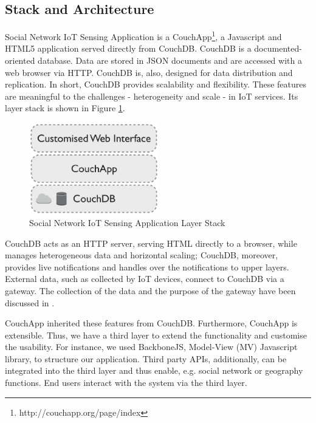 \subsection{Stack and Architecture}
Social Network IoT Sensing Application is a CouchApp\footnote{http://couchapp.org/page/index}, a Javascript and HTML5 application served directly from CouchDB. CouchDB is a documented-oriented database. Data are stored in JSON documents and are accessed with a web browser via HTTP. CouchDB is, also, designed for data distribution and replication. In short, CouchDB provides scalability and flexibility. These features are meaningful to the challenges\cite{francesco2012storage} - heterogeneity and scale - in IoT services. Its layer stack is shown in Figure \ref{fig:data-centre-app-stack}.

\begin{figure}[ht]
  \begin{center}
    \includegraphics[width=0.5\textwidth]{images/data-centre-app-stack.pdf}
    \caption{Social Network IoT Sensing Application Layer Stack}
    \label{fig:data-centre-app-stack}
  \end{center}
\end{figure}

CouchDB acts as an HTTP server, serving HTML directly to a browser, while manages heterogeneous data and horizontal scaling; CouchDB, moreover, provides live notifications and handles over the notifications to upper layers. External data, such as collected by IoT devices, connect to CouchDB via a gateway. The collection of the data and the purpose of the gateway have been discussed in \cite{francesco2012storage}. 

CouchApp inherited these features from CouchDB. Furthermore, CouchApp is extensible. Thus, we have a third layer to extend the functionality and customise the usability. For instance, we used BackboneJS, Model-View (MV) Javascript library, to structure our application. Third party APIs, additionally, can be integrated into the third layer and thus enable, e.g. social network or geography functions. End users interact with the system via the third layer. 

